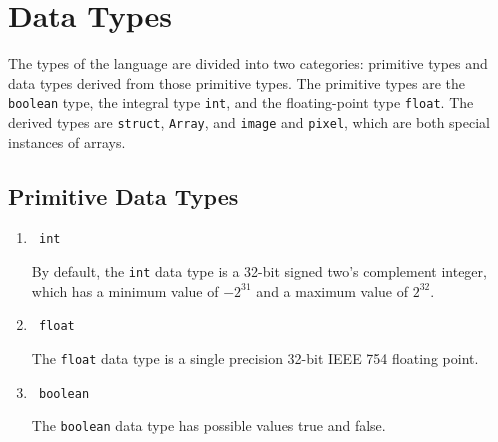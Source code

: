 \section{Data Types}

The types of the language are divided into two categories: primitive types and data types derived from those primitive types. The primitive types are the \lstinline|boolean| type, the integral type \lstinline|int|, and the  floating-point type \lstinline|float|. The derived types are \lstinline|struct|, \lstinline|Array|, and \lstinline|image| and \lstinline|pixel|, which are both special instances of arrays.
\subsection{Primitive Data Types}\label{ssec:Primitive Data Types} 
\begin{enumerate}
\item \begin{verbatim} int \end{verbatim}
By default, the  \lstinline|int|
data type is a 32-bit signed two's complement integer, which has a minimum value of $-2^{31}$ 
and a maximum value of $2^{32}$.
\item \begin{verbatim} float \end{verbatim}
The \lstinline|float| data type is a single precision 32-bit IEEE 754 floating point. 
\item \begin{verbatim} boolean \end{verbatim}
The \lstinline|boolean| data type has possible values true and false. 
\end{enumerate} 
